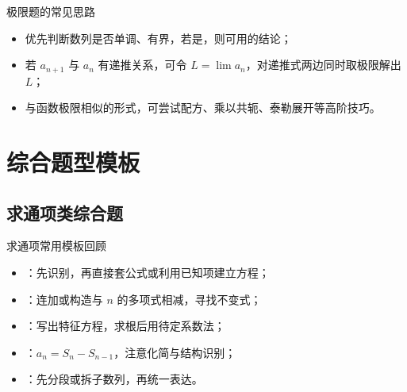 \documentclass[a4paper,11pt]{ctexart}
\begin{document}
\begin{center}
\end{center}

\begin{notebox}{极限题的常见思路}
  \begin{itemize}
    \item 优先判断数列是否单调、有界，若是，则可用的结论；
    \item 若 $a_{n+1}$ 与 $a_n$ 有递推关系，可令 $L=\lim a_n$，对递推式两边同时取极限解出 $L$；
    \item 与函数极限相似的形式，可尝试配方、乘以共轭、泰勒展开等高阶技巧。
  \end{itemize}
\end{notebox}

\clearpage
\section{综合题型模板}

\subsection{求通项类综合题}

\begin{summarybox}{求通项常用模板回顾}
  \begin{itemize}
    \item {}：先识别，再直接套公式或利用已知项建立方程；
    \item {}：连加或构造与 $n$ 的多项式相减，寻找不变式；
    \item {}：写出特征方程，求根后用待定系数法；
    \item {}：$a_n=S_n-S_{n-1}$，注意化简与结构识别；
    \item {}：先分段或拆子数列，再统一表达。
  \end{itemize}
\end{summarybox}
\end{document}
